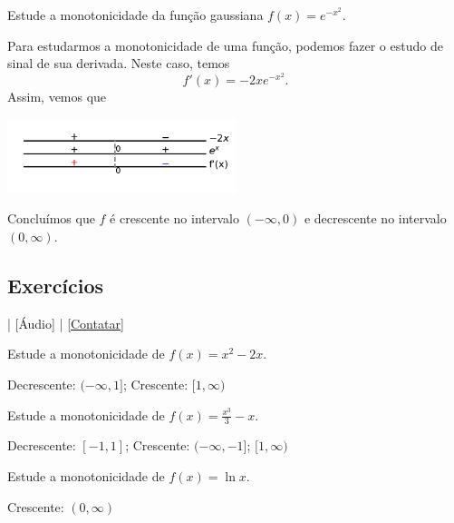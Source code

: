 \begin{exeresol}
  Estude a monotonicidade da função gaussiana $f(x) = e^{-x^2}$.  
\end{exeresol}
\begin{resol}
  Para estudarmos a monotonicidade de uma função, podemos fazer o estudo de sinal de sua derivada. Neste caso, temos
  \begin{equation}
    f'(x) = -2xe^{-x^2}.
  \end{equation}
  Assim, vemos que
  \begin{center}
    \includegraphics[width=0.5\textwidth]{./cap_apderiv/dados/fig_exeresol_gauss_estsinal/fig_exeresol_gauss_estsinal}
  \end{center}
  Concluímos que $f$ é crescente no intervalo $(-\infty, 0)$ e decrescente no intervalo $(0, \infty)$.
\end{resol}

\subsection*{Exercícios}

\begin{flushright}
  [Vídeo] | [Áudio] | \href{https://phkonzen.github.io/notas/contato.html}{[Contatar]}
\end{flushright}

\begin{exer}
  Estude a monotonicidade de $f(x) = x^2 - 2x$.
\end{exer}
\begin{resp}
  Decrescente: $(-\infty, 1]$; Crescente: $[1, \infty)$
\end{resp}

\begin{exer}
  Estude a monotonicidade de $\displaystyle f(x) = \frac{x^3}{3}-x$.
\end{exer}
\begin{resp}
  Decrescente: $[-1, 1]$; Crescente: $(-\infty, -1]$; $[1, \infty)$
\end{resp}

\begin{exer}
  Estude a monotonicidade de $\displaystyle f(x) = \ln x$.
\end{exer}
\begin{resp}
  Crescente: $(0, \infty)$
\end{resp}


